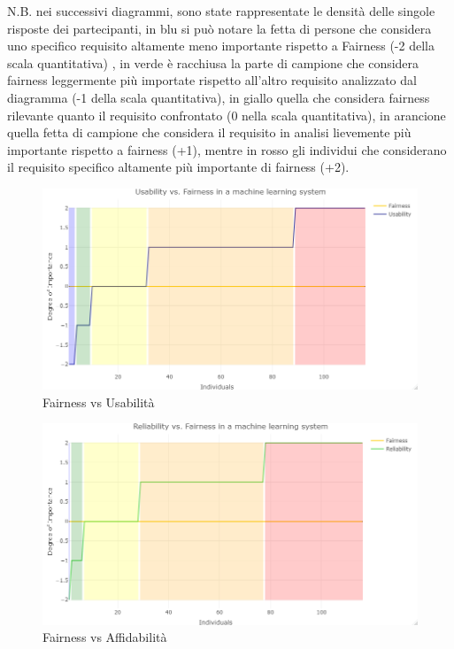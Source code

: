 	N.B. nei successivi diagrammi, sono state rappresentate le densità delle singole risposte dei partecipanti, in blu si può notare la fetta di persone che considera uno specifico requisito altamente meno importante rispetto a Fairness (-2 della scala quantitativa) , in verde è racchiusa la parte di campione che considera fairness leggermente più importate rispetto all'altro requisito analizzato dal diagramma (-1 della scala quantitativa), in giallo quella che considera fairness rilevante quanto il requisito confrontato (0 nella scala quantitativa), in arancione quella fetta di campione che considera il requisito in analisi lievemente più importante rispetto a fairness (+1), mentre in rosso gli individui che considerano il requisito specifico altamente più importante di fairness (+2).
	\begin{figure}[h!]
        \centering
        \includegraphics[width=1\textwidth]{figure/Analisi/RQ3/1.Usability_vs_Fairness.png}
        \caption{Fairness vs Usabilità}
    \end{figure}
    
    \begin{figure}[h!]
        \centering
        \includegraphics[width=1\textwidth]{figure/Analisi/RQ3/2.Reliability_vs_Fairness.png}
        \caption{Fairness vs Affidabilità}
    \end{figure}
    
